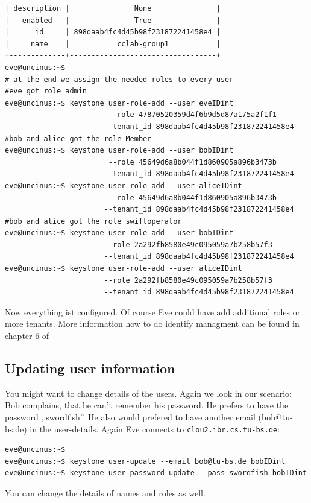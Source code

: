 \documentclass[a4paper,bibtotoc,english,liststotoc]{scrartcl}
\begin{document}
\begin{verbatim}
| description |               None               |
|   enabled   |               True               |
|      id     | 898daab4fc4d45b98f231872241458e4 |
|     name    |           cclab-group1           |
+-------------+----------------------------------+
eve@uncinus:~$ 
# at the end we assign the needed roles to every user
#eve got role admin
eve@uncinus:~$ keystone user-role-add --user eveIDint  
                        --role 47870520359d4f6b9d5d87a175a2f1f1 
                       --tenant_id 898daab4fc4d45b98f231872241458e4
#bob and alice got the role Member
eve@uncinus:~$ keystone user-role-add --user bobIDint 
                        --role 45649d6a8b044f1d860905a896b3473b 
                       --tenant_id 898daab4fc4d45b98f231872241458e4
eve@uncinus:~$ keystone user-role-add --user aliceIDint 
                        --role 45649d6a8b044f1d860905a896b3473b 
                       --tenant_id 898daab4fc4d45b98f231872241458e4
#bob and alice got the role swiftoperator
eve@uncinus:~$ keystone user-role-add --user bobIDint    
                       --role 2a292fb8580e49c095059a7b258b57f3 
                       --tenant_id 898daab4fc4d45b98f231872241458e4
eve@uncinus:~$ keystone user-role-add --user aliceIDint  
                       --role 2a292fb8580e49c095059a7b258b57f3 
                       --tenant_id 898daab4fc4d45b98f231872241458e4
\end{verbatim}
Now everything ist configured. Of course Eve could have add additional
roles or more tenants. More information how to do identify managment
can be found in chapter 6 of \cite{computeadmin}%

\subsection{Updating user information}
\label{sec:updat-user-inform}
You might want to change details of the users. Again we look in our
scenario:
Bob complains, that he can't remember his password. He prefers to have
the password ,,swordfish''. He also would prefered to have another email
(bob@tu-bs.de) in the user-details.
Again Eve connects to \verb|clou2.ibr.cs.tu-bs.de|:
\begin{verbatim}
eve@uncinus:~$
eve@uncinus:~$ keystone user-update --email bob@tu-bs.de bobIDint
eve@uncinus:~$ keystone user-password-update --pass swordfish bobIDint
\end{verbatim}
You can change the details of names and roles as well. 
\end{document}

